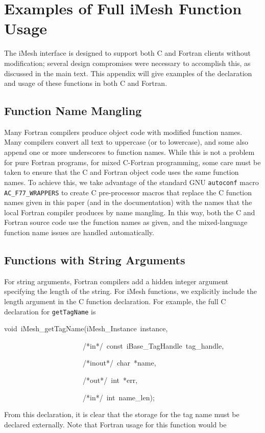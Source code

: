\begin{lyxcode}

\end{lyxcode}

\section{Examples of Full iMesh Function Usage}\label{app:ITAPS-examples}

The iMesh interface is designed to support both C and Fortran clients
without modification; several design compromises were necessary to
accomplish this, as discussed in the main text. This appendix will give
examples of the declaration and usage of these functions in both C and
Fortran.


\subsection{Function Name Mangling}

Many Fortran compilers produce object code with modified function
names. Many compilers convert all text to uppercase (or to lowercase),
and some also append one or more underscores to function names. While
this is not a problem for pure Fortran programs, for mixed C-Fortran
programming, some care must be taken to ensure that the C and Fortran
object code uses the same function names. To achieve this, we take
advantage of the standard GNU \texttt{autoconf} macro
\texttt{AC\_F77\_WRAPPERS} to create C pre-processor macros that replace
the C function names given in this paper (and in the documentation) with
the names that the local Fortran compiler produces by name mangling. In
this way, both the C and Fortran source code use the function names as
given, and the mixed-language function name issues are handled
automatically.


\subsection{Functions with String Arguments}

For string arguments, Fortran compilers add a hidden integer argument
specifying the length of the string. For iMesh functions, we explicitly
include the length argument in the C function declaration. For example,
the full C declaration for \texttt{getTagName} is

\begin{lyxcode}
void~iMesh\_getTagName(iMesh\_Instance~instance,~

~~~~~~~~~~~~~~~~~~~~~~/{*}in{*}/~const~iBase\_TagHandle~tag\_handle,~

~~~~~~~~~~~~~~~~~~~~~~/{*}inout{*}/~char~{*}name,~

~~~~~~~~~~~~~~~~~~~~~~/{*}out{*}/~int~{*}err,~

~~~~~~~~~~~~~~~~~~~~~~/{*}in{*}/~int~name\_len);
\end{lyxcode}
From this declaration, it is clear that the storage for the tag name
must be declared externally. Note that Fortran usage for this function
would be

